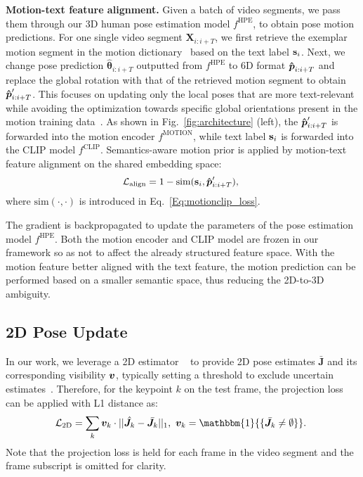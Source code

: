 \noindent\textbf{Motion-text feature alignment.} Given a batch of video segments, we pass them through our 3D human pose estimation model $f^{\text{HPE}}$, to obtain pose motion predictions. 
For one single video segment $\mathbf{X}_{i:i+T}$, we first retrieve the exemplar motion segment in the motion dictionary~\cite{BABEL} based on the text label ${\mathbf{s}}_i$. Next, we change pose prediction $\boldsymbol{\hat{\theta}}_{i:i+T}$ outputted from $f^{\text{HPE}}$ to 6D format $\boldsymbol{\hat{{\bm{p}}}}_{i:i+T}$ and replace the global rotation with that of the retrieved motion segment to obtain $\boldsymbol{\hat{{\bm{p}}}}'_{i:i+T}$. 
This focuses on updating only the local poses that are more text-relevant while avoiding the optimization towards specific global orientations present in the motion training data~\cite{BABEL}. 
As shown in Fig.~\ref{fig:architecture} (left), the $\boldsymbol{\hat{{\bm{p}}}}'_{i:i+T}$ is forwarded into the motion encoder $f^{\text{MOTION}}$, while text label ${\mathbf{s}}_i$ is forwarded into the CLIP model $f^{\text{CLIP}}$.
Semantics-aware motion prior is applied by motion-text feature alignment on the shared embedding space:
\begin{equation}
    {\mathcal{L}}_{\textnormal{align}}= 1-\text{sim}({\mathbf{s}}_i,\boldsymbol{\hat{{\bm{p}}}}'_{i:i+T}),
    ~\label{Eq:2d_loss}
\end{equation}
where $\text{sim}(\cdot,\cdot)$ is introduced in Eq.~\ref{Eq:motionclip_loss}.

The gradient is backpropagated {to update the parameters of the pose estimation model $f^{\text{HPE}}$}.
Both the motion encoder and CLIP model are frozen in our framework so as not to affect the already structured feature space.  
With the motion feature better aligned with the text feature, the motion prediction can be performed based on a smaller semantic space, thus reducing the 2D-to-3D ambiguity.


\subsection{2D Pose Update}\label{sec:label_update}

In our work, we leverage 
a 2D estimator
~\cite{openpose} to provide 2D pose estimates $\bar{\bm{J}}$ and its corresponding visibility ${\bm{v}}$, typically setting a threshold to exclude uncertain estimates~\cite{dynaboa,cycleadapt}. Therefore, for the keypoint $k$ on the test frame,
the projection loss can be applied with L1 distance as:
\begin{equation}
    \gL_{\textnormal{2D}}= \sum_k \vv_k\cdot||\hat{\bm{J}}_k-\bar{\bm{J}}_k||_1,\ \vv_k=\mathbbm{1}{\{\bar{\bm{J}}_k\neq\emptyset\}}.
    ~\label{Eq:align_loss}
\end{equation}
Note that the projection loss is held for each frame in the video segment and the frame subscript is omitted for clarity.

